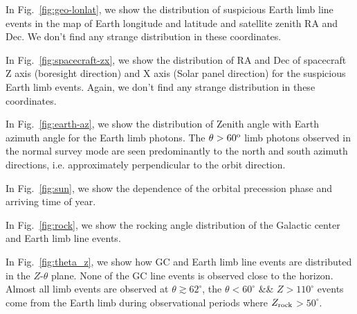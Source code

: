 \documentclass[aps,twocolumn,prd,superscriptaddress,showpacs,nofootinbib,fixfloat]{revtex4}
\newcommand{\degree}{^{\rm o}}
\newcommand{\zrock}{$Z_{\rm rock}$}
\begin{document}
In Fig.~\ref{fig:geo-lonlat}, we show the distribution of
suspicious Earth limb line events in the map of Earth
longitude and latitude and satellite zenith RA and Dec. We
don't find any strange distribution in these
coordinates. 

In Fig.~\ref{fig:spacecraft-zx}, we show the distribution of
RA and Dec of spacecraft Z axis (boresight direction) and X
axis (Solar panel direction) for the suspicious Earth limb
events. Again, we don't find any strange distribution in these
coordinates. 

In Fig.~\ref{fig:earth-az}, we show the distribution of
 Zenith angle with Earth azimuth angle for the Earth limb
 photons. The $\theta > 60\degree$ limb photons observed in
 the normal survey mode are seen predominantly to the north
 and south azimuth directions, i.e. approximately
 perpendicular to the orbit direction. 

In Fig.~\ref{fig:sun}, we show the dependence of the orbital
precession phase and arriving time of year.

In Fig.~\ref{fig:rock}, we show the rocking angle
distribution of the Galactic center and Earth limb line
events.

In Fig.~\ref{fig:theta_z}, we show how GC and Earth limb
line events are distributed in the $Z$-$\theta$ plane. None
of the GC line events is observed close to the
horizon. Almost all limb events are observed at
$\theta\gtrsim 62^\circ$, the $\theta<60^\circ$ \&\&
$Z>110^\circ$ events come from the Earth limb during
observational periods where \zrock$>50^\circ$.


\end{document}
